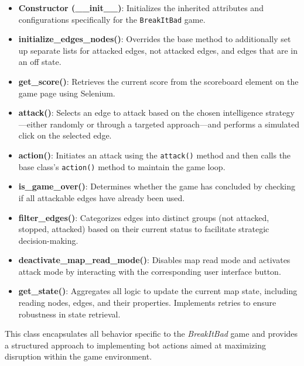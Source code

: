 \documentclass[12pt,a4paper]{report}
\begin{document}
        \begin{itemize}
            \item \textbf{Constructor (\_\_init\_\_)}: Initializes the inherited attributes and configurations specifically for the \texttt{BreakItBad} game.

            \item \textbf{initialize\_edges\_nodes()}: Overrides the base method to additionally set up separate lists for attacked edges, not attacked edges, and edges that are in an off state.

            \item \textbf{get\_score()}: Retrieves the current score from the scoreboard element on the game page using Selenium.

            \item \textbf{attack()}: Selects an edge to attack based on the chosen intelligence strategy—either randomly or through a targeted approach—and performs a simulated click on the selected edge.

            \item \textbf{action()}: Initiates an attack using the \texttt{attack()} method and then calls the base class's \texttt{action()} method to maintain the game loop.

            \item \textbf{is\_game\_over()}: Determines whether the game has concluded by checking if all attackable edges have already been used.

            \item \textbf{filter\_edges()}: Categorizes edges into distinct groups (not attacked, stopped, attacked) based on their current status to facilitate strategic decision-making.

            \item \textbf{deactivate\_map\_read\_mode()}: Disables map read mode and activates attack mode by interacting with the corresponding user interface button.

            \item \textbf{get\_state()}: Aggregates all logic to update the current map state, including reading nodes, edges, and their properties. Implements retries to ensure robustness in state retrieval.
        \end{itemize}

        This class encapsulates all behavior specific to the \textit{BreakItBad} game and provides a structured approach to implementing bot actions aimed at maximizing disruption within the game environment.
\end{document}
